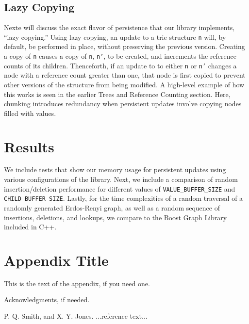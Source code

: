 \documentclass[preprint]{sigplanconf}
\begin{document}
\subsection{Lazy Copying}
Nexte will discuss the exact flavor of persistence that our library implements, ``lazy copying.''
Using lazy copying, an update to a trie structure \texttt{n} will, by default, be performed in place, without preserving the previous version. 
Creating a copy of \texttt{n} causes a copy of \texttt{n}, \texttt{n'}, to be created, and increments the reference counts of its children.
Thenceforth, if an update to to either \texttt{n} or \texttt{n'} changes a node with a reference count greater than one, that node is first copied to prevent other versions of the structure from being modified.
A high-level example of how this works is seen in the earlier Trees and Reference Counting section.
Here, chunking introduces redundancy when persistent updates involve copying nodes filled with values.

\section{Results}
We include tests that show our memory usage for persistent updates using various configurations of the library.
Next, we include a comparison of random insertion/deletion performance for different values of \texttt{VALUE\_BUFFER\_SIZE} and \texttt{CHILD\_BUFFER\_SIZE}.
Lastly, for the time complexities of a random traversal of a randomly generated Erdos-Renyi graph, as well as a random sequence of insertions, deletions, and lookups, we compare to the Boost Graph Library included in C++.

\appendix
\section{Appendix Title}

This is the text of the appendix, if you need one.

\acks

Acknowledgments, if needed.





\begin{thebibliography}{}
\softraggedright

P. Q. Smith, and X. Y. Jones. ...reference text...

\end{thebibliography}
\end{document}
